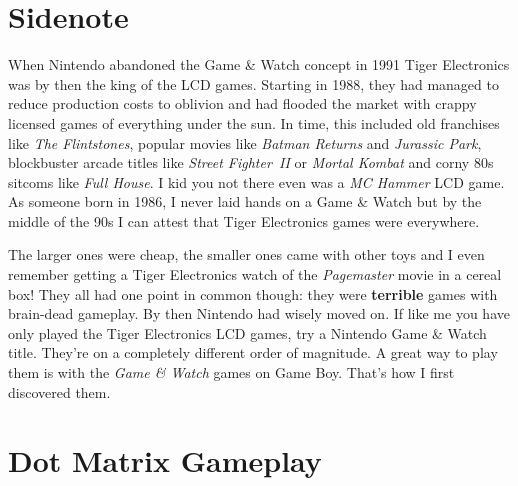 \documentclass{book}
\let\oldcenter\center
\let\oldendcenter\endcenter
\renewenvironment{center}{\setlength\topsep{0pt}\oldcenter}{\oldendcenter}
\begin{document}
\FloatBarrier\needspace{5pt}\section*{Sidenote}\nopagebreak[4]

When Nintendo abandoned the Game \& Watch concept in 1991 Tiger Electronics was by then the king of the LCD games. Starting in 1988, they had managed to reduce production costs to oblivion and had flooded the market with crappy licensed games of everything under the sun. In time, this included old franchises like \emph{The Flintstones}, popular movies like \emph{Batman Returns} and \emph{Jurassic Park}, blockbuster arcade titles like \emph{Street Fighter II} or \emph{Mortal Kombat} and corny 80s sitcoms like \emph{Full House}. I kid you not there even was a \emph{MC Hammer} LCD game. As someone born in 1986, I never laid hands on a Game \& Watch but by the middle of the 90s I can attest that Tiger Electronics games were everywhere.

\begin{center}
\vspace{8pt}
\quad\vspace{4pt}
\end{center}

The larger ones were cheap, the smaller ones came with other toys and I even remember getting a Tiger Electronics watch of the \emph{Pagemaster} movie in a cereal box! They all had one point in common though: they were \textbf{terrible} games with brain-dead gameplay. By then Nintendo had wisely moved on. If like me you have only played the Tiger Electronics LCD games, try a Nintendo Game \& Watch title. They’re on a completely different order of magnitude. A great way to play them is with the \emph{Game \& Watch} games on Game Boy. That’s how I first discovered them.

\FloatBarrier\needspace{5pt}\section*{Dot Matrix Gameplay}\nopagebreak[4]
\end{document}
